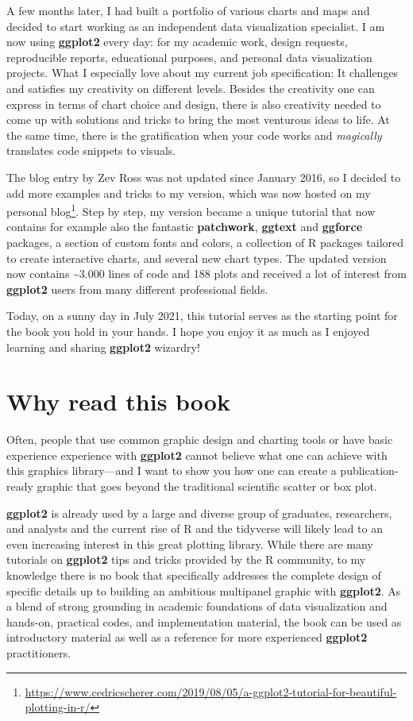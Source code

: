 \documentclass[
]{krantz}
\renewcommand{\href}[2]{#2\footnote{\url{#1}}}
\begin{document}
A few months later, I had built a portfolio of various charts and maps and decided to start working as an independent data visualization specialist. I am now using \textbf{ggplot2} every day: for my academic work, design requests, reproducible reports, educational purposes, and personal data visualization projects. What I especially love about my current job specification: It challenges and satisfies my creativity on different levels. Besides the creativity one can express in terms of chart choice and design, there is also creativity needed to come up with solutions and tricks to bring the most venturous ideas to life. At the same time, there is the gratification when your code works and \emph{magically} translates code snippets to visuals.

The blog entry by Zev Ross was not updated since January 2016, so I decided to add more examples and tricks to my version, which was now hosted on my \href{https://www.cedricscherer.com/2019/08/05/a-ggplot2-tutorial-for-beautiful-plotting-in-r/}{personal blog}. Step by step, my version became a unique tutorial that now contains for example also the fantastic \textbf{patchwork}, \textbf{ggtext} and \textbf{ggforce} packages, a section of custom fonts and colors, a collection of R packages tailored to create interactive charts, and several new chart types. The updated version now contains \textasciitilde3.000 lines of code and 188 plots and received a lot of interest from \textbf{ggplot2} users from many different professional fields.

Today, on a sunny day in July 2021, this tutorial serves as the starting point for the book you hold in your hands. I hope you enjoy it as much as I enjoyed learning and sharing \textbf{ggplot2} wizardry!

\hypertarget{why-read-this-book}{%
\section*{Why read this book}\label{why-read-this-book}}


Often, people that use common graphic design and charting tools or have basic experience experience with \textbf{ggplot2} cannot believe what one can achieve with this graphics library---and I want to show you how one can create a publication-ready graphic that goes beyond the traditional scientific scatter or box plot.

\textbf{ggplot2} is already used by a large and diverse group of graduates, researchers, and analysts and the current rise of R and the tidyverse will likely lead to an even increasing interest in this great plotting library. While there are many tutorials on \textbf{ggplot2} tips and tricks provided by the R community, to my knowledge there is no book that specifically addresses the complete design of specific details up to building an ambitious multipanel graphic with \textbf{ggplot2}. As a blend of strong grounding in academic foundations of data visualization and hands-on, practical codes, and implementation material, the book can be used as introductory material as well as a reference for more experienced \textbf{ggplot2} practitioners.
\end{document}
